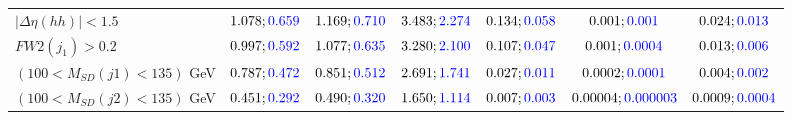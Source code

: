 \begin{landscape}
\begin{table}
\begin{tabular}{lcccccc}
				\rowcolor{black!7}$|\Delta\eta(hh)|<1.5$& $1.078;\textcolor{blue}{0.659}$&$1.169;\textcolor{blue}{0.710}$ &$3.483;\textcolor{blue}{2.274}$ &$0.134;\textcolor{blue}{0.058}$ &$0.001;\textcolor{blue}{0.001}$ &$0.024;\textcolor{blue}{0.013}$\\
				$FW2(j_1)>0.2$ &$0.997;\textcolor{blue}{0.592}$ &$1.077;\textcolor{blue}{0.635}$&$3.280;\textcolor{blue}{2.100}$&$0.107;\textcolor{blue}{0.047}$&$0.001;\textcolor{blue}{0.0004}$&$0.013;\textcolor{blue}{0.006}$\\
				\rowcolor{black!7}$(100<M_{SD}(j1)<135)$ GeV& $0.787;\textcolor{blue}{0.472}$&$0.851;\textcolor{blue}{0.512}$&$2.691;\textcolor{blue}{1.741}$&$0.027;\textcolor{blue}{0.011}$&$0.0002;\textcolor{blue}{0.0001}$&$0.004;\textcolor{blue}{0.002}$\\
				$(100<M_{SD}(j2)<135)$ GeV &$0.451;\textcolor{blue}{0.292}$ &$0.490;\textcolor{blue}{0.320}$ &$1.650;\textcolor{blue}{1.114}$&$0.007;\textcolor{blue}{0.003}$&$0.00004;\textcolor{blue}{0.000003}$&$0.0009;\textcolor{blue}{0.0004}$\\
				\bottomrule
			\end{tabular}
		\end{table}

\end{landscape}
	




